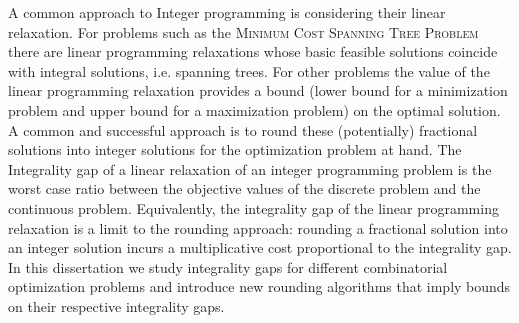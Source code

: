 A common approach to Integer programming is considering their linear relaxation. For problems such as the \textsc{Minimum Cost Spanning Tree Problem} there are linear programming relaxations whose basic feasible solutions coincide with  integral solutions, i.e. spanning trees. For other problems the value of the linear programming relaxation provides a bound (lower bound for a minimization problem and upper bound for a maximization problem) on the optimal solution. A common and successful approach is to round these (potentially) fractional solutions into integer solutions for the optimization problem at hand. The Integrality gap of a linear relaxation of an integer programming problem is the worst case ratio between the objective values of the discrete problem and the continuous problem. Equivalently, the integrality gap of the linear programming relaxation is a limit to the rounding approach: rounding a fractional solution into an integer solution incurs
a multiplicative cost proportional to the integrality gap. In this dissertation we study integrality gaps for different combinatorial optimization problems and introduce new rounding algorithms that imply bounds on their respective integrality gaps. 

